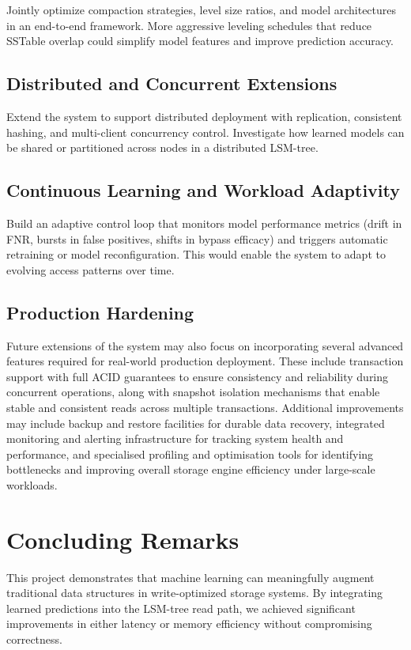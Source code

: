 \documentclass{mnitjaipur}
\begin{document}
Jointly optimize compaction strategies, level size ratios, and model architectures in an end-to-end framework. More aggressive leveling schedules that reduce SSTable overlap could simplify model features and improve prediction accuracy.

\subsection{Distributed and Concurrent Extensions}

Extend the system to support distributed deployment with replication, consistent hashing, and multi-client concurrency control. Investigate how learned models can be shared or partitioned across nodes in a distributed LSM-tree.

\subsection{Continuous Learning and Workload Adaptivity}

Build an adaptive control loop that monitors model performance metrics (drift in FNR, bursts in false positives, shifts in bypass efficacy) and triggers automatic retraining or model reconfiguration. This would enable the system to adapt to evolving access patterns over time.

\subsection{Production Hardening}

Future extensions of the system may also focus on incorporating several advanced features required for real-world production deployment. These include transaction support with full ACID guarantees to ensure consistency and reliability during concurrent operations, along with snapshot isolation mechanisms that enable stable and consistent reads across multiple transactions. Additional improvements may include backup and restore facilities for durable data recovery, integrated monitoring and alerting infrastructure for tracking system health and performance, and specialised profiling and optimisation tools for identifying bottlenecks and improving overall storage engine efficiency under large-scale workloads.

\section{Concluding Remarks}

This project demonstrates that machine learning can meaningfully augment traditional data structures in write-optimized storage systems. By integrating learned predictions into the LSM-tree read path, we achieved significant improvements in either latency or memory efficiency without compromising correctness.
\end{document}
